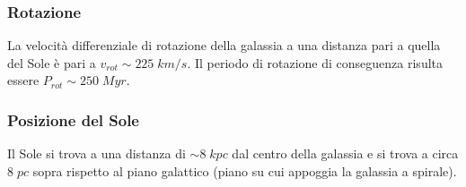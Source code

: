 \subsubsection{Rotazione}
La velocità differenziale di rotazione della galassia a una distanza pari a quella del Sole è pari a $v_{rot} \sim 225 \;\si{km}/\si{s}$. Il periodo di rotazione di conseguenza risulta essere $P_{rot} \sim 250 \; \si{Myr}$.

\subsubsection{Posizione del Sole}
Il Sole si trova a una distanza di $\sim 8 \;\si{kpc}$ dal centro della galassia e si trova a circa $8 \;\si{pc}$ sopra rispetto al piano galattico (piano su cui appoggia la galassia a spirale).

